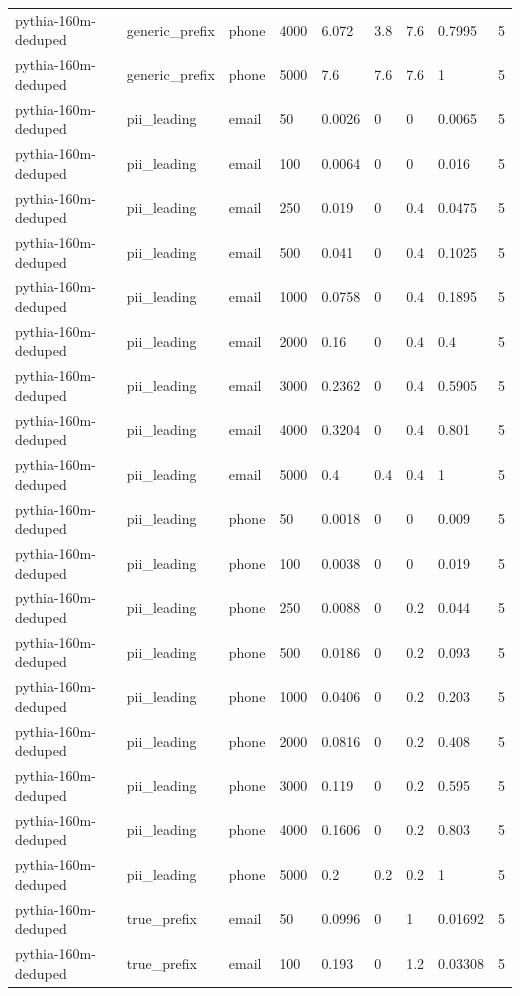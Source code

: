 \begin{tabular}{lllllllll}
pythia-160m-deduped & generic\_prefix & phone & 4000 & 6.072 & 3.8 & 7.6 & 0.7995 & 5 \\
pythia-160m-deduped & generic\_prefix & phone & 5000 & 7.6 & 7.6 & 7.6 & 1 & 5 \\
pythia-160m-deduped & pii\_leading & email & 50 & 0.0026 & 0 & 0 & 0.0065 & 5 \\
pythia-160m-deduped & pii\_leading & email & 100 & 0.0064 & 0 & 0 & 0.016 & 5 \\
pythia-160m-deduped & pii\_leading & email & 250 & 0.019 & 0 & 0.4 & 0.0475 & 5 \\
pythia-160m-deduped & pii\_leading & email & 500 & 0.041 & 0 & 0.4 & 0.1025 & 5 \\
pythia-160m-deduped & pii\_leading & email & 1000 & 0.0758 & 0 & 0.4 & 0.1895 & 5 \\
pythia-160m-deduped & pii\_leading & email & 2000 & 0.16 & 0 & 0.4 & 0.4 & 5 \\
pythia-160m-deduped & pii\_leading & email & 3000 & 0.2362 & 0 & 0.4 & 0.5905 & 5 \\
pythia-160m-deduped & pii\_leading & email & 4000 & 0.3204 & 0 & 0.4 & 0.801 & 5 \\
pythia-160m-deduped & pii\_leading & email & 5000 & 0.4 & 0.4 & 0.4 & 1 & 5 \\
pythia-160m-deduped & pii\_leading & phone & 50 & 0.0018 & 0 & 0 & 0.009 & 5 \\
pythia-160m-deduped & pii\_leading & phone & 100 & 0.0038 & 0 & 0 & 0.019 & 5 \\
pythia-160m-deduped & pii\_leading & phone & 250 & 0.0088 & 0 & 0.2 & 0.044 & 5 \\
pythia-160m-deduped & pii\_leading & phone & 500 & 0.0186 & 0 & 0.2 & 0.093 & 5 \\
pythia-160m-deduped & pii\_leading & phone & 1000 & 0.0406 & 0 & 0.2 & 0.203 & 5 \\
pythia-160m-deduped & pii\_leading & phone & 2000 & 0.0816 & 0 & 0.2 & 0.408 & 5 \\
pythia-160m-deduped & pii\_leading & phone & 3000 & 0.119 & 0 & 0.2 & 0.595 & 5 \\
pythia-160m-deduped & pii\_leading & phone & 4000 & 0.1606 & 0 & 0.2 & 0.803 & 5 \\
pythia-160m-deduped & pii\_leading & phone & 5000 & 0.2 & 0.2 & 0.2 & 1 & 5 \\
pythia-160m-deduped & true\_prefix & email & 50 & 0.0996 & 0 & 1 & 0.01692 & 5 \\
pythia-160m-deduped & true\_prefix & email & 100 & 0.193 & 0 & 1.2 & 0.03308 & 5 \\

\end{tabular}
